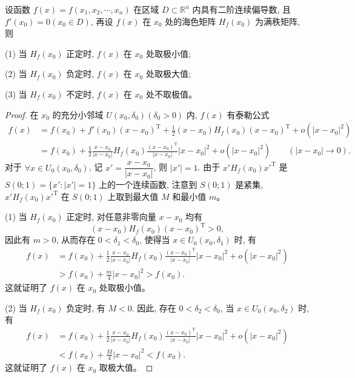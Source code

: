 \documentclass[UTF8,12pt,a4paper,fontset=fandol]{ctexart}
\begin{document}
\begin{theorem}\label{course-theorem-14-5-2}\quad 设函数 $f(x)=f(x_1,x_2,\cdots,x_n)$ 在区域 $D\subset\mathbb R^n$ 内具有二阶连续偏导数, 且 $f'(x_0)=0(x_0\in D)$, 再设 $f(x)$ 在 $x_0$ 处的海色矩阵 $H_f(x_0)$ 为满秩矩阵, 则

\noindent (1) 当 $H_f(x_0)$ 正定时, $f(x)$ 在 $x_0$ 处取极小值;

\noindent (2) 当 $H_f(x_0)$ 负定时, $f(x)$ 在 $x_0$ 处取极大值;

\noindent (3) 当 $H_f(x_0)$ 不定时, $f(x)$ 在 $x_0$ 处不取极值。

\end{theorem}
\begin{proof}\quad 在 $x_0$ 的充分小邻域 $U(x_0,\delta_0)(\delta_0>0)$ 内, $f(x)$ 有泰勒公式
\[
\begin{aligned}
  f(x)
  &=f(x_0)+f'(x_0)(x-x_0)^{\mathrm T}
    +\frac12(x-x_0)H_f(x_0)(x-x_0)^{\mathrm T}
    +o(|x-x_0|^2)\\
  &=f(x_0)+\frac12
    \frac{x-x_0}{|x-x_0|}
    H_f(x_0)
    \frac{(x-x_0)^{\mathrm T}}{|x-x_0|}
    |x-x_0|^2
    +o(|x-x_0|^2)
    \qquad (|x-x_0|\to0).
\end{aligned}
\]
对于 $\forall x\in U_0(x_0,\delta_0)$, 记 $x'=\dfrac{x-x_0}{|x-x_0|}$, 则 $|x'|=1$. 由于 $x'H_f(x_0)x'^{\mathrm T}$ 是 $S(0;1)=\{x':|x'|=1\}$ 上的一个连续函数, 注意到 $S(0;1)$ 是紧集, $x'H_f(x_0)x'^{\mathrm T}$ 在 $S(0;1)$ 上取到最大值 $M$ 和最小值 $m$。

\noindent (1) 当 $H_f(x_0)$ 正定时, 对任意非零向量 $x-x_0$ 均有
\[
  (x-x_0)H_f(x_0)(x-x_0)^{\mathrm T}>0,
\]
因此有 $m>0$, 从而存在 $0<\delta_1<\delta_0$, 使得当 $x\in U_0(x_0,\delta_1)$ 时, 有
\[
\begin{aligned}
  f(x)
  &=f(x_0)+\frac12
    \frac{x-x_0}{|x-x_0|}
    H_f(x_0)
    \frac{(x-x_0)^{\mathrm T}}{|x-x_0|}
    |x-x_0|^2+o(|x-x_0|^2)\\
  &>f(x_0)+\frac m4|x-x_0|^2>f(x_0).
\end{aligned}
\]
这就证明了 $f(x)$ 在 $x_0$ 处取极小值。

\noindent (2) 当 $H_f(x_0)$ 负定时, 有 $M<0$. 因此, 存在 $0<\delta_2<\delta_0$, 当 $x\in U_0(x_0,\delta_2)$ 时, 有
\[
\begin{aligned}
  f(x)
  &=f(x_0)+\frac12
    \frac{x-x_0}{|x-x_0|}
    H_f(x_0)
    \frac{(x-x_0)^{\mathrm T}}{|x-x_0|}
    |x-x_0|^2+o(|x-x_0|^2)\\
  &<f(x_0)+\frac M4|x-x_0|^2<f(x_0).
\end{aligned}
\]
这就证明了 $f(x)$ 在 $x_0$ 取极大值。


\end{proof}
\end{document}
